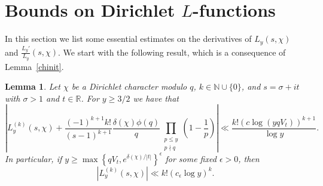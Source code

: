 \documentclass[12pt]{amsart}
\newtheorem{lemma}[theorem]{Lemma}
\theoremstyle{remark}
\newcommand {\SN} {{\mathbb N}}
\newcommand {\SR} {{\mathbb R}}
\newcommand{\be}{\begin{equation}}
\newcommand{\ee}{\end{equation}}
\numberwithin{equation}{section}
\begin{document}


\section{Bounds on Dirichlet $L$-functions}\label{lchi}

In this section we list some essential estimates on the derivatives of $L_y(s,\chi)$ and $\frac{L_y'}{L_y}(s,\chi)$. We start with the following result, which is a consequence of Lemma~\ref{chinit}.

\begin{lemma}\label{lchil1} Let $\chi$ be a Dirichlet character modulo $q$, $k\in\SN\cup\{0\}$, and $s=\sigma+it$ with $\sigma>1$ and $t\in\SR$. For $y\ge3/2$ we have that
\be\label{lchil1 e1}
\left|L_y^{(k)}(s,\chi)+\frac{(-1)^{k+1}k!}{(s-1)^{k+1}}\frac{\delta(\chi)\phi(q)}q\prod_{\substack{p\le y\\p\nmid q}}\left(1-\frac1p\right)\right|\ll\frac{k!(c\log(yqV_t))^{k+1}}{\log y}.
\ee
In particular, if $y\ge\max\left\{qV_t,e^{\delta(\chi)/|t|}\right\}^\epsilon$ for some fixed $\epsilon>0$, then
\be\label{lchil1 e2}
\left|L_y^{(k)}(s,\chi)\right|\ll k!(c_\epsilon\log y)^k.
\ee
\end{lemma}
\end{document}
